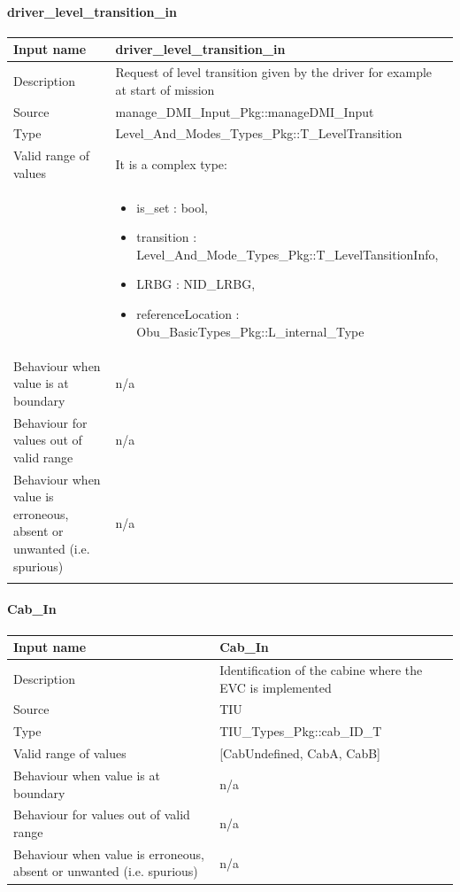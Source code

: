 \paragraph{driver\_level\_transition\_in}

\begin{longtable}{p{}p{}}
\toprule
Input name				& driver\_level\_transition\_in \\
\midrule
Description				& Request of level transition given by the driver for example at start of mission \\
\midrule
Source					& manage\_DMI\_Input\_Pkg::manageDMI\_Input \\ 
\midrule
Type					& Level\_And\_Modes\_Types\_Pkg::T\_LevelTransition \\
\midrule
Valid range of values	& It is a complex type:  \\
& \begin{itemize}
\item is\_set : bool,
\item transition : Level\_And\_Mode\_Types\_Pkg::T\_LevelTansitionInfo, 
\item LRBG : NID\_LRBG, 
\item referenceLocation : Obu\_BasicTypes\_Pkg::L\_internal\_Type
\end{itemize} \\
\midrule
Behaviour when value is at boundary	& n/a \\ 
\midrule
Behaviour for values out of valid range	& n/a \\ 
\midrule
Behaviour when value is erroneous, absent or unwanted (i.e. spurious) & n/a \\ 
\bottomrule \\ 
\end{longtable}


\paragraph{Cab\_In}

\begin{longtable}{p{}p{}}
\toprule
Input name				& Cab\_In \\
\midrule
Description				& Identification of the cabine where the EVC is implemented \\
\midrule
Source					& TIU \\ 
\midrule
Type					& TIU\_Types\_Pkg::cab\_ID\_T \\
\midrule
Valid range of values	&  [CabUndefined, CabA, CabB] \\
\midrule
Behaviour when value is at boundary	& n/a \\ 
\midrule
Behaviour for values out of valid range	& n/a \\ 
\midrule
Behaviour when value is erroneous, absent or unwanted (i.e. spurious) & n/a \\ 
\bottomrule
\end{longtable}


